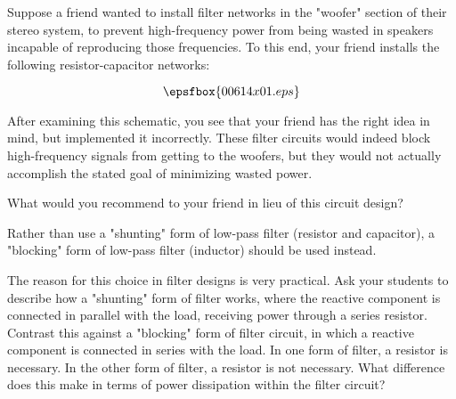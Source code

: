 

Suppose a friend wanted to install filter networks in the "woofer" section of their stereo system, to prevent high-frequency power from being wasted in speakers incapable of reproducing those frequencies.  To this end, your friend installs the following resistor-capacitor networks:

$$\epsfbox{00614x01.eps}$$

After examining this schematic, you see that your friend has the right idea in mind, but implemented it incorrectly.  These filter circuits would indeed block high-frequency signals from getting to the woofers, but they would not actually accomplish the stated goal of minimizing wasted power.

What would you recommend to your friend in lieu of this circuit design?







Rather than use a "shunting" form of low-pass filter (resistor and capacitor), a "blocking" form of low-pass filter (inductor) should be used instead.







The reason for this choice in filter designs is very practical.  Ask your students to describe how a "shunting" form of filter works, where the reactive component is connected in parallel with the load, receiving power through a series resistor.  Contrast this against a "blocking" form of filter circuit, in which a reactive component is connected in series with the load.  In one form of filter, a resistor is necessary.  In the other form of filter, a resistor is not necessary.  What difference does this make in terms of power dissipation within the filter circuit?




